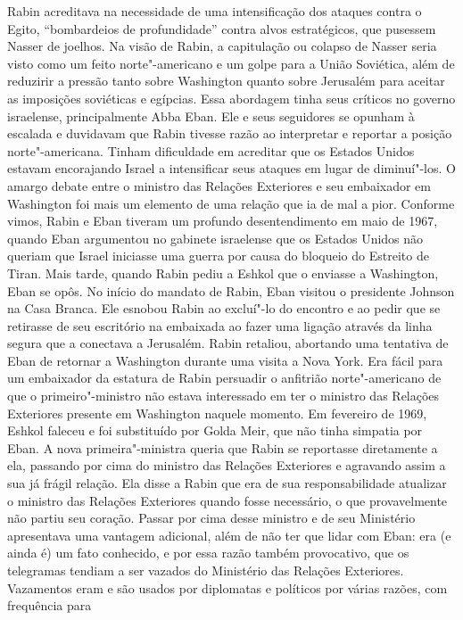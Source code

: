 Rabin acreditava na necessidade de uma intensificação dos ataques contra
o Egito, ``bombardeios de profundidade'' contra alvos estratégicos, que
pusessem Nasser de joelhos. Na visão de Rabin, a capitulação ou colapso
de Nasser seria visto como um feito norte"-americano e um golpe para a
União Soviética, além de reduzirir a pressão tanto sobre Washington quanto
sobre Jerusalém para aceitar as imposições soviéticas e egípcias. Essa
abordagem tinha seus críticos no governo israelense, principalmente Abba
Eban. Ele e seus seguidores se opunham à escalada e duvidavam que Rabin
tivesse razão ao interpretar e reportar a posição norte"-americana.
Tinham dificuldade em acreditar que os Estados Unidos estavam
encorajando Israel a intensificar seus ataques em lugar de diminuí"-los.
O amargo debate entre o ministro das Relações Exteriores e seu
embaixador em Washington foi mais um elemento de uma relação que ia de
mal a pior. Conforme vimos, Rabin e Eban tiveram um profundo
desentendimento em maio de 1967, quando Eban argumentou no gabinete
israelense que os Estados Unidos não queriam que Israel iniciasse uma
guerra por causa do bloqueio do Estreito de Tiran. Mais tarde, quando
Rabin pediu a Eshkol que o enviasse a Washington, Eban se opôs. No
início do mandato de Rabin, Eban visitou o presidente Johnson na Casa
Branca. Ele esnobou Rabin ao excluí"-lo do encontro e ao pedir que se
retirasse de seu escritório na embaixada ao fazer uma ligação através da
linha segura que a conectava a Jerusalém. Rabin retaliou, abortando uma
tentativa de Eban de retornar a Washington durante uma visita a Nova
York. Era fácil para um embaixador da estatura de Rabin persuadir o
anfitrião norte"-americano de que o primeiro"-ministro não estava
interessado em ter o ministro das Relações Exteriores presente em
Washington naquele momento. Em fevereiro de 1969, Eshkol faleceu e foi
substituído por Golda Meir, que não tinha simpatia por Eban. A nova
primeira"-ministra queria que Rabin se reportasse diretamente a ela,
passando por cima do ministro das Relações Exteriores e agravando assim a
sua já frágil relação. Ela disse a Rabin que era de sua responsabilidade
atualizar o ministro das Relações Exteriores quando fosse necessário, o
que provavelmente não partiu seu coração. Passar por cima desse ministro e
de seu Ministério apresentava uma vantagem adicional,
além de não ter que lidar com Eban: era (e ainda é) um fato conhecido, e
por essa razão também provocativo, que os telegramas tendiam a ser
vazados do Ministério das Relações Exteriores. Vazamentos eram e são
usados por diplomatas e políticos por várias razões, com frequência para

